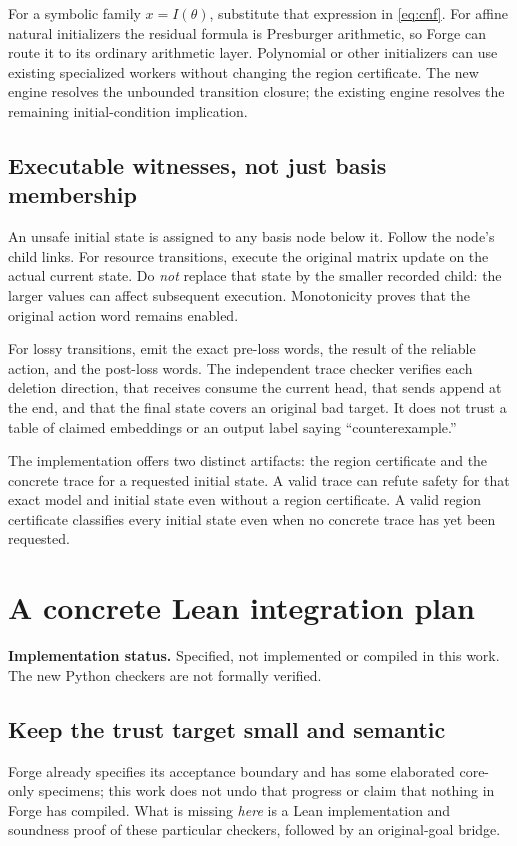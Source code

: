\documentclass[11pt,a4paper]{article}
\theoremstyle{definition}
\newcommand{\status}[1]{\noindent\textbf{Implementation status.} #1\par}
\begin{document}
For a symbolic family $x=I(\theta)$, substitute that expression in
\eqref{eq:cnf}. For affine natural initializers the residual formula is
Presburger arithmetic, so Forge can route it to its ordinary arithmetic
layer. Polynomial or other initializers can use existing specialized workers
without changing the region certificate. The new engine resolves the
unbounded transition closure; the existing engine resolves the remaining
initial-condition implication.

\subsection{Executable witnesses, not just basis membership}
An unsafe initial state is assigned to any basis node below it. Follow the
node's child links. For resource transitions, execute the original matrix
update on the actual current state. Do \emph{not} replace that state by the
smaller recorded child: the larger values can affect subsequent execution.
Monotonicity proves that the original action word remains enabled.

For lossy transitions, emit the exact pre-loss words, the result of the
reliable action, and the post-loss words. The independent trace checker
verifies each deletion direction, that receives consume the current head,
that sends append at the end, and that the final state covers an original
bad target. It does not trust a table of claimed embeddings or an output
label saying ``counterexample.''

The implementation offers two distinct artifacts: the region certificate and
the concrete trace for a requested initial state. A valid trace can refute
safety for that exact model and initial state even without a region
certificate. A valid region certificate classifies every initial state even
when no concrete trace has yet been requested.

\section{A concrete Lean integration plan}
\label{sec:lean}
\status{Specified, not implemented or compiled in this work. The new Python checkers are not formally verified.}

\subsection{Keep the trust target small and semantic}
Forge already specifies its acceptance boundary and has some elaborated
core-only specimens; this work does not undo that progress or claim that
nothing in Forge has compiled. What is missing \emph{here} is a Lean
implementation and soundness proof of these particular checkers, followed by
an original-goal bridge.\cite{forgestatus}
\end{document}
